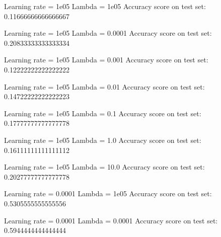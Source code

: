 \documentclass[letterpaper,10pt,english]{sphinxmanual}
\begin{document}
\begin{sphinxVerbatim}[commandchars=\\\{\}]
Learning rate  =  1e\PYGZhy{}05
Lambda =  1e\PYGZhy{}05
Accuracy score on test set:  0.11666666666666667
\end{sphinxVerbatim}

\begin{sphinxVerbatim}[commandchars=\\\{\}]
Learning rate  =  1e\PYGZhy{}05
Lambda =  0.0001
Accuracy score on test set:  0.20833333333333334
\end{sphinxVerbatim}

\begin{sphinxVerbatim}[commandchars=\\\{\}]
Learning rate  =  1e\PYGZhy{}05
Lambda =  0.001
Accuracy score on test set:  0.12222222222222222
\end{sphinxVerbatim}

\begin{sphinxVerbatim}[commandchars=\\\{\}]
Learning rate  =  1e\PYGZhy{}05
Lambda =  0.01
Accuracy score on test set:  0.14722222222222223
\end{sphinxVerbatim}

\begin{sphinxVerbatim}[commandchars=\\\{\}]
Learning rate  =  1e\PYGZhy{}05
Lambda =  0.1
Accuracy score on test set:  0.17777777777777778
\end{sphinxVerbatim}

\begin{sphinxVerbatim}[commandchars=\\\{\}]
Learning rate  =  1e\PYGZhy{}05
Lambda =  1.0
Accuracy score on test set:  0.16111111111111112
\end{sphinxVerbatim}

\begin{sphinxVerbatim}[commandchars=\\\{\}]
Learning rate  =  1e\PYGZhy{}05
Lambda =  10.0
Accuracy score on test set:  0.20277777777777778
\end{sphinxVerbatim}

\begin{sphinxVerbatim}[commandchars=\\\{\}]
Learning rate  =  0.0001
Lambda =  1e\PYGZhy{}05
Accuracy score on test set:  0.5305555555555556
\end{sphinxVerbatim}

\begin{sphinxVerbatim}[commandchars=\\\{\}]
Learning rate  =  0.0001
Lambda =  0.0001
Accuracy score on test set:  0.5944444444444444
\end{sphinxVerbatim}
\end{document}
